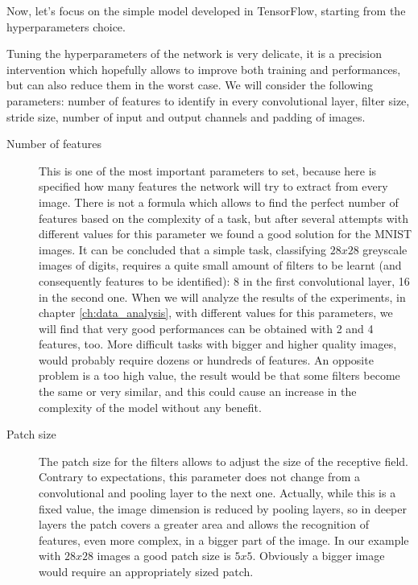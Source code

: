 Now, let's focus on the simple model developed in TensorFlow, starting from the hyperparameters choice.

Tuning the hyperparameters of the network is very delicate, it is a precision intervention which hopefully allows to improve both training and performances, but can also reduce them in the worst case. We will consider the following parameters: number of features to identify in every convolutional layer, filter size, stride size, number of input and output channels and padding of images.

\begin{description}
	
	\item[Number of features] This is one of the most important parameters to set, because here is specified how many features the network will try to extract from every image. There is not a formula which allows to find the perfect number of features based on the complexity of a task, but after several attempts with different values for this parameter we found a good solution for the \acs{MNIST} images. It can be concluded that a simple task, \eg classifying $28x28$ greyscale images of digits, requires a quite small amount of filters to be learnt (and consequently features to be identified): 8 in the first convolutional layer, 16 in the second one. When we will analyze the results of the experiments, in chapter \ref{ch:data_analysis}, with different values for this parameters, we will find that very good performances can be obtained with 2 and 4 features, too. More difficult tasks with bigger and higher quality images, would probably require dozens or hundreds of features. An opposite problem is a too high value, the result would be that some filters become the same or very similar, and this could cause an increase in the complexity of the model without any benefit.

	\item[Patch size] The patch size for the filters allows to adjust the size of the receptive field. Contrary to expectations, this parameter does not change from a convolutional and pooling layer to the next one. Actually, while this is a fixed value, the image dimension is reduced by pooling layers, so in deeper layers the patch covers a greater area and allows the recognition of features, even more complex, in a bigger part of the image.  In our example with $28x28$ images a good patch size is $5x5$. Obviously a bigger image would require an appropriately sized patch.
	

\end{description}
